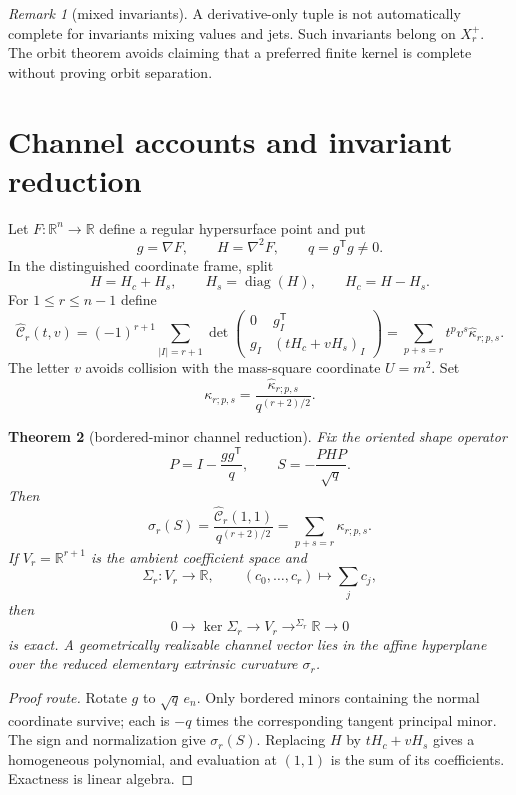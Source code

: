 \documentclass[11pt]{article}
\newtheorem{theorem}{Theorem}[section]
\theoremstyle{remark}
\newtheorem{remark}[theorem]{Remark}
\newcommand{\R}{\mathbb R}
\begin{document}
\begin{remark}[mixed invariants]
A derivative-only tuple is not automatically complete for invariants mixing
values and jets. Such invariants belong on $X_r^+$. The orbit theorem avoids
claiming that a preferred finite kernel is complete without proving orbit
separation.
\end{remark}

\section{Channel accounts and invariant reduction}

Let $F:\R^n\to\R$ define a regular hypersurface point and put
\[
g=\nabla F,\qquad H=\nabla^2F,\qquad q=g^{\mathsf T}g\neq0.
\]
In the distinguished coordinate frame, split
\[
H=H_c+H_s,\qquad H_s=\operatorname{diag}(H),\qquad H_c=H-H_s.
\]
For $1\leq r\leq n-1$ define
\[
\widehat{\mathcal C}_r(t,v)
=(-1)^{r+1}\sum_{|I|=r+1}
\det\begin{pmatrix}
0&g_I^{\mathsf T}\\
g_I&(tH_c+vH_s)_I
\end{pmatrix}
=\sum_{p+s=r}t^pv^s\widehat\kappa_{r;p,s}.
\]
The letter $v$ avoids collision with the mass-square coordinate $U=m^2$.
Set
\[
\kappa_{r;p,s}
=\frac{\widehat\kappa_{r;p,s}}{q^{(r+2)/2}}.
\]

\begin{theorem}[bordered-minor channel reduction]\label{thm:reduction}
Fix the oriented shape operator
\[
P=I-\frac{gg^{\mathsf T}}q,\qquad
S=-\frac{PHP}{\sqrt q}.
\]
Then
\[
\sigma_r(S)
=\frac{\widehat{\mathcal C}_r(1,1)}{q^{(r+2)/2}}
=\sum_{p+s=r}\kappa_{r;p,s}.
\]
If $V_r=\R^{r+1}$ is the ambient coefficient space and
\[
\Sigma_r:V_r\to\R,\qquad
(c_0,\ldots,c_r)\longmapsto\sum_jc_j,
\]
then
\[
0\longrightarrow\ker\Sigma_r
\longrightarrow V_r
\mathop{\longrightarrow}^{\Sigma_r}\R
\longrightarrow0
\]
is exact. A geometrically realizable channel vector lies in the affine
hyperplane over the reduced elementary extrinsic curvature $\sigma_r$.
\end{theorem}

\begin{proof}[Proof route]
Rotate $g$ to $\sqrt q\,e_n$. Only bordered minors containing the normal
coordinate survive; each is $-q$ times the corresponding tangent principal
minor. The sign and normalization give $\sigma_r(S)$. Replacing $H$ by
$tH_c+vH_s$ gives a homogeneous polynomial, and evaluation at $(1,1)$ is the
sum of its coefficients. Exactness is linear algebra.
\end{proof}
\end{document}
